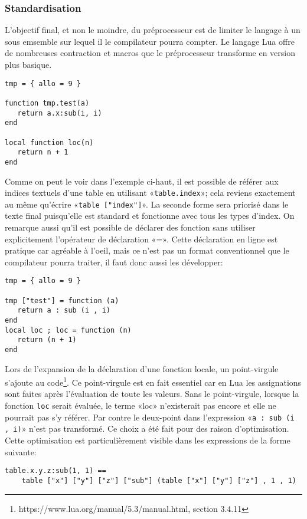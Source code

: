 \documentclass{article}
\begin{document}
\subsubsection{Standardisation}
L'objectif final, et non le moindre, du préprocesseur est de limiter le langage à un sous emsemble sur lequel il le compilateur pourra compter. Le langage Lua offre de nombreuses contraction et macros que le préprocesseur transforme en version plus basique.
\begin{lstlisting}[caption={Utilisation des contractions et des macros},label=DescriptiveLabel]
tmp = { allo = 9 }

function tmp.test(a)
   return a.x:sub(i, i)
end

local function loc(n)
   return n + 1
end
\end{lstlisting}

Comme on peut le voir dans l'exemple ci-haut, il est possible de référer aux indices textuels d'une table en utilisant «\texttt{table.index}»; cela reviens exactement au même qu'écrire «\texttt{table ["index"]}». La seconde forme sera priorisé dans le texte final puisqu'elle est standard et fonctionne avec tous les types d'index. On remarque aussi qu'il est possible de déclarer des fonction sans utiliser explicitement l'opérateur de déclaration «=». Cette déclaration en ligne est pratique car agréable à l'oeil, mais ce n'est pas un format conventionnel que le compilateur pourra traiter, il faut donc aussi les développer:
\begin{lstlisting}[belowcaptionskip = -1\baselineskip]
tmp = { allo = 9 } 

tmp ["test"] = function (a) 
   return a : sub (i , i) 
end 
local loc ; loc = function (n) 
   return (n + 1) 
end 
\end{lstlisting}

Lors de l'expansion de la déclaration d'une fonction locale, un point-virgule s'ajoute au code\footnote{https://www.lua.org/manual/5.3/manual.html, section 3.4.11}. Ce point-virgule est en fait essentiel car en Lua les assignations sont faites après l'évaluation de toute les valeurs. Sans le point-virgule, lorsque la fonction \texttt{loc} serait évaluée, le terme «loc» n'existerait pas encore et elle ne pourrait pas s'y référer. Par contre le deux-point dans l'expression «\texttt{a : sub (i , i)}» n'est pas transformé. Ce choix a été fait pour des raison d'optimisation. Cette optimisation est particulièrement visible dans les expressions de la forme suivante:
\begin{lstlisting}[caption={Développement sous-optimal},label=DescriptiveLabel]
table.x.y.z:sub(1, 1) ==
	table ["x"] ["y"] ["z"] ["sub"] (table ["x"] ["y"] ["z"] , 1 , 1)
\end{lstlisting}
\end{document}
